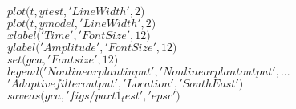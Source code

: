  \hspace*{-2em}{\scriptsize 66}$  plot(t, ytest, $\color{mdarkgrey}$'LineWidth'$\color{black}$, 2)$\\
 \hspace*{-2em}{\scriptsize 67}$  plot(t, ymodel, $\color{mdarkgrey}$'LineWidth'$\color{black}$, 2)$\\
 \hspace*{-2em}{\scriptsize 68}$  xlabel($\color{mdarkgrey}$'Time'$\color{black}$, $\color{mdarkgrey}$'FontSize'$\color{black}$, 12)$\\
 \hspace*{-2em}{\scriptsize 69}$  ylabel($\color{mdarkgrey}$'Amplitude'$\color{black}$, $\color{mdarkgrey}$'FontSize'$\color{black}$, 12)$\\
 \hspace*{-2em}{\scriptsize 70}$  set(gca, $\color{mdarkgrey}$'Fontsize'$\color{black}$, 12)$\\
 \hspace*{-2em}{\scriptsize 71}$  legend($\color{mdarkgrey}$'Nonlinear plant input'$\color{black}$, $\color{mdarkgrey}$'Nonlinear plant output'$\color{black}$,...$\\
 \hspace*{-2em}{\scriptsize 72}$      $\color{mdarkgrey}$'Adaptive filter output'$\color{black}$, $\color{mdarkgrey}$'Location'$\color{black}$, $\color{mdarkgrey}$'SouthEast'$\color{black}$)$\\
 \hspace*{-2em}{\scriptsize 73}$  saveas(gca, $\color{mdarkgrey}$'figs/part1_test'$\color{black}$, $\color{mdarkgrey}$'epsc'$\color{black}$)$\\ 
  
\UndefineShortVerb{\$} 
\UndefineShortVerb{\#}
